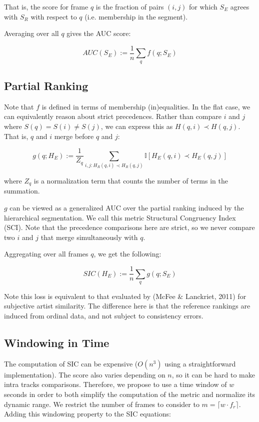 \documentclass{article}
\begin{document}
That is, the score for frame $q$ is the fraction of pairs $(i, j)$ for which $S_E$ agrees with $S_R$ with respect to $q$ (i.e. membership in the segment).

Averaging over all $q$ gives the AUC score:

\begin{equation}
AUC(S_E) := \frac{1}{n} \sum_q f(q ; S_E)
\end{equation}

\subsection{Partial Ranking}

Note that $f$ is defined in terms of membership (in)equalities.
In the flat case, we can equivalently reason about strict precedences.
Rather than compare $i$ and $j$ where $S(q) = S(i) \neq S(j)$, we can express this as $H(q, i) \prec H(q, j)$.
That is, $q$ and $i$ merge before $q$ and $j$:

\begin{equation}
g(q ; H_E) := \frac{1}{Z_q} \sum_{i,j : H_R(q, i) \prec H_R(q, j)}  \mathbb{I}\left[ H_E(q, i) \prec H_E(q, j) \right]
\end{equation}

where $Z_q$ is a normalization term that counts the number of terms in the summation.

$g$ can be viewed as a generalized AUC over the partial ranking induced by the hierarchical segmentation.
We call this metric Structural Congruency Index (SCI).
Note that the precedence comparisons here are strict, so we never compare two $i$ and $j$ that merge simultaneously with $q$.

Aggregating over all frames $q$, we get the following:

\begin{equation}
SIC(H_E) := \frac{1}{n} \sum_q g(q ; S_E)
\end{equation}

Note this loss is equivalent to that evaluated by (McFee \& Lanckriet, 2011) for subjective artist similarity.
The difference here is that the reference rankings are induced from ordinal data, and not subject to consistency errors.

\subsection{Windowing in Time}

The computation of SIC can be expensive ($O(n^3)$ using a straightforward implementation).
The score also varies depending on $n$, so it can be hard to make intra tracks comparisons.
Therefore, we propose to use a time window of $w$ seconds in order to both simplify the computation of the metric and normalize its dynamic range.
We restrict the number of frames to consider to $m = \lceil w \cdot f_r \rceil$.
Adding this windowing property to the SIC equations:
\end{document}

